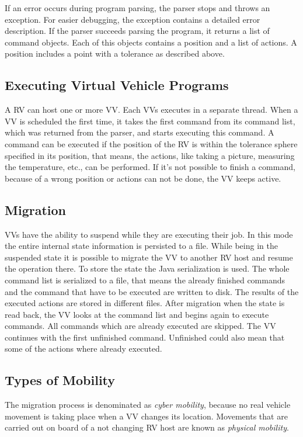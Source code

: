 If an error occurs during program parsing, the parser stops and throws an exception. For easier debugging, the exception
contains a detailed error description. If the parser succeeds parsing the program, it returns a list of command objects.
Each of this objects contains a position and a list of actions.
A position includes a point with a tolerance as described above.

\subsection{Executing Virtual Vehicle Programs}

A \ac{RV} can host one or more \ac{VV}. Each \acp{VV} executes in a separate thread.
When a \ac{VV} is scheduled the first time, it takes the first command from its command list, which was
returned from the parser, and starts executing this command. A command can be executed if the position of the \ac{RV} is
within the tolerance sphere specified in its position, that means, the actions, like taking a picture, measuring the
temperature, etc., can be performed.
If it's not possible to finish a command, because of a wrong position or actions can not be done, the \ac{VV} keeps
active.


\subsection{Migration}

\acp{VV} have the ability to suspend while they are executing their job. In this mode the entire internal state 
information is persisted to a file. While being in the suspended state it is possible to migrate the \ac{VV} to another
\ac{RV} host and resume the operation there. To store the state the Java serialization is used. The whole command
list is serialized to a file, that means the already finished commands and the command that have to be executed are
written to disk. The results of the executed actions are stored in different files. After migration when the state is
read back, the \ac{VV} looks at the command list and begins again to execute commands. All commands which are already
executed are skipped. The \ac{VV} continues with the first unfinished command. Unfinished could also mean that some of
the actions where already executed.


\subsection{Types of Mobility}
The migration process is denominated as \emph{cyber mobility}, because no real vehicle movement is taking place when a
\ac{VV} changes its location. Movements that are carried out on board of a not changing \ac{RV} host
are known as \emph{physical mobility}.

